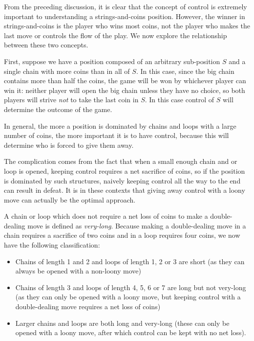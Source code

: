\documentclass[a4paper,twocolumn]{article}
\begin{document}
From the preceding discussion, it is clear that the concept of control
is extremely important to understanding a strings-and-coins
position. However, the winner in strings-and-coins is the player who
wins most coins, not the player who makes the last move or controls
the flow of the play. We now explore the relationship between these
two concepts.

First, suppose we have a position composed of an arbitrary
sub-position $S$ and a single chain with more coins than in all of
$S$. In this case, since the big chain contains more than half the
coins, the game will be won by whichever player can win it: neither
player will open the big chain unless they have no choice, so both
players will strive \emph{not} to take the last coin in $S$. In this
case control of $S$ will determine the outcome of the game.

In general, the more a position is dominated by chains and loops with
a large number of coins, the more important it is to have control,
because this will determine who is forced to give them away.

The complication comes from the fact that when a small enough chain
and or loop is opened, keeping control requires a net sacrifice of
coins, so if the position is dominated by such structures, naively
keeping control all the way to the end can result in defeat. It is in
these contexts that giving away control with a loony move can actually
be the optimal approach.

A chain or loop which does not require a net loss of coins to make a
double-dealing move is defined as \emph{very-long}. Because making a
double-dealing move in a chain requires a sacrifice of two coins and
in a loop requires four coins, we now have the following
classification:

\begin{itemize}
  \item Chains of length 1 and 2 and loops of length 1, 2 or 3 are
    short (as they can always be opened with a non-loony move)
  \item Chains of length 3 and loops of length 4, 5, 6 or 7 are long
    but not very-long (as they can only be opened with a loony move,
    but keeping control with a double-dealing move requires a net loss
    of coins)
  \item Larger chains and loops are both long and very-long (these can
    only be opened with a loony move, after which control can be kept
    with no net loss).
\end{itemize}
\end{document}
